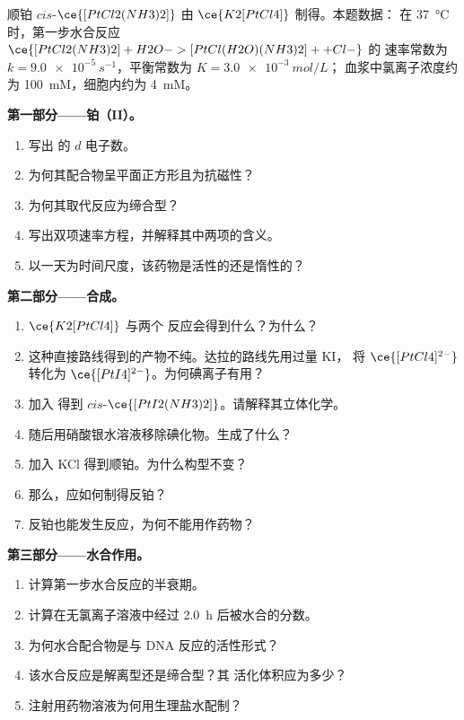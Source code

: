 \begin{problem}
\label{pb:b3:complex-mechanisms:1}
顺铂 $cis$-$\ce{[PtCl2(NH3)2]}$ 由 $\ce{K2[PtCl4]}$ 制得。本题数据：
在 \qty{37}{\celsius} 时，第一步水合反应 $\ce{[PtCl2(NH3)2] + H2O -> [PtCl(H2O)(NH3)2]+ + Cl-}$ 的
速率常数为 $k = \qty{9.0e-5}{s^{-1}}$，平衡常数为 $K = \qty{3.0e-3}{mol/L}$；
血浆中氯离子浓度约为 \qty{100}{mM}，细胞内约为 \qty{4}{mM}。

\medskip\noindent\textbf{第一部分——铂（II）。}
\begin{enumerate}
  \item 写出  的 $d$ 电子数。
  \item 为何其配合物呈平面正方形且为抗磁性？
  \item 为何其取代反应为缔合型？
  \item 写出双项速率方程，并解释其中两项的含义。
  \item 以一天为时间尺度，该药物是活性的还是惰性的？
\end{enumerate}

\medskip\noindent\textbf{第二部分——合成。}
\begin{enumerate}[resume]
  \item $\ce{K2[PtCl4]}$ 与两个  反应会得到什么？为什么？
  \item 这种直接路线得到的产物不纯。达拉的路线先用过量 KI，
        将 $\ce{[PtCl4]^{2-}}$ 转化为 $\ce{[PtI4]^{2-}}$。为何碘离子有用？
  \item 加入  得到 $cis$-$\ce{[PtI2(NH3)2]}$。请解释其立体化学。
  \item 随后用硝酸银水溶液移除碘化物。生成了什么？
  \item 加入 KCl 得到顺铂。为什么构型不变？
  \item 那么，应如何制得反铂？
  \item 反铂也能发生反应，为何不能用作药物？
\end{enumerate}

\medskip\noindent\textbf{第三部分——水合作用。}
\begin{enumerate}[resume]
  \item 计算第一步水合反应的半衰期。
  \item 计算在无氯离子溶液中经过 \qty{2.0}{h} 后被水合的分数。
  \item 为何水合配合物是与 DNA 反应的活性形式？
  \item 该水合反应是解离型还是缔合型？其
        活化体积应为多少？
  \item 注射用药物溶液为何用生理盐水配制？
\end{enumerate}


\end{problem}
